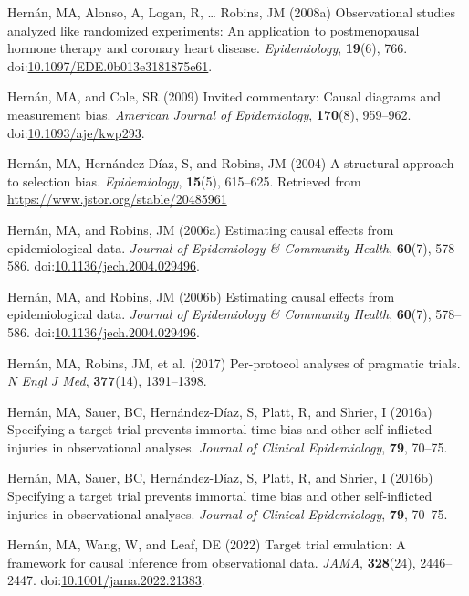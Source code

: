 \documentclass[
  single column]{article}
\newlength{\cslhangindent}
\newenvironment{CSLReferences}[2] %
 {\begin{list}{}{%
  \setlength{\itemindent}{0pt}
  \setlength{\leftmargin}{0pt}
  \setlength{\parsep}{0pt}
  \ifodd #1
   \setlength{\leftmargin}{\cslhangindent}
   \setlength{\itemindent}{-1\cslhangindent}
  \fi
  \setlength{\itemsep}{#2\baselineskip}}}
 {\end{list}}
\begin{document}
\begin{CSLReferences}{1}{0}
Hernán, MA, Alonso, A, Logan, R, \ldots{} Robins, JM (2008a)
Observational studies analyzed like randomized experiments: An
application to postmenopausal hormone therapy and coronary heart
disease. \emph{Epidemiology}, \textbf{19}(6), 766.
doi:\href{https://doi.org/10.1097/EDE.0b013e3181875e61}{10.1097/EDE.0b013e3181875e61}.

Hernán, MA, and Cole, SR (2009) Invited commentary: Causal diagrams and
measurement bias. \emph{American Journal of Epidemiology},
\textbf{170}(8), 959--962.
doi:\href{https://doi.org/10.1093/aje/kwp293}{10.1093/aje/kwp293}.

Hernán, MA, Hernández-Díaz, S, and Robins, JM (2004) A structural
approach to selection bias. \emph{Epidemiology}, \textbf{15}(5),
615--625. Retrieved from \url{https://www.jstor.org/stable/20485961}

Hernán, MA, and Robins, JM (2006a) Estimating causal effects from
epidemiological data. \emph{Journal of Epidemiology \& Community
Health}, \textbf{60}(7), 578--586.
doi:\href{https://doi.org/10.1136/jech.2004.029496}{10.1136/jech.2004.029496}.

Hernán, MA, and Robins, JM (2006b) Estimating causal effects from
epidemiological data. \emph{Journal of Epidemiology \& Community
Health}, \textbf{60}(7), 578--586.
doi:\href{https://doi.org/10.1136/jech.2004.029496}{10.1136/jech.2004.029496}.

Hernán, MA, Robins, JM, et al. (2017) Per-protocol analyses of pragmatic
trials. \emph{N Engl J Med}, \textbf{377}(14), 1391--1398.

Hernán, MA, Sauer, BC, Hernández-Díaz, S, Platt, R, and Shrier, I
(2016a) Specifying a target trial prevents immortal time bias and other
self-inflicted injuries in observational analyses. \emph{Journal of
Clinical Epidemiology}, \textbf{79}, 70--75.

Hernán, MA, Sauer, BC, Hernández-Díaz, S, Platt, R, and Shrier, I
(2016b) Specifying a target trial prevents immortal time bias and other
self-inflicted injuries in observational analyses. \emph{Journal of
Clinical Epidemiology}, \textbf{79}, 70--75.

Hernán, MA, Wang, W, and Leaf, DE (2022) Target trial emulation: A
framework for causal inference from observational data. \emph{JAMA},
\textbf{328}(24), 2446--2447.
doi:\href{https://doi.org/10.1001/jama.2022.21383}{10.1001/jama.2022.21383}.


\end{CSLReferences}
\end{document}
